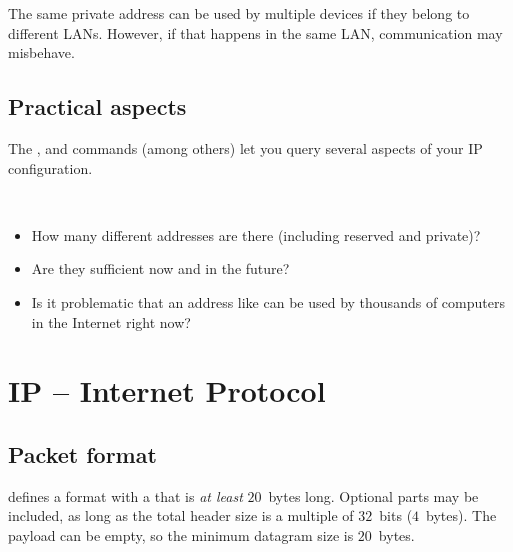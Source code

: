 \begin{remark}
The same private address can be used by multiple devices if they belong to different LANs.
However, if that happens in the same LAN, communication may misbehave.
\end{remark}

\subsection*{Practical aspects}

The ,  and  commands 
(among others) let you query several aspects of your IP configuration.

\begin{exercise}\ \\[-0.5cm]
\begin{itemize}
\item How many different  addresses are there (including reserved and private)? 
\item Are they sufficient now and in the future?
\item Is it problematic that an address like  can be used by thousands
  of computers in the Internet right now?
\end{itemize}
\end{exercise}


\section{IP -- Internet Protocol}

\subsection*{Packet format}

 defines a  format with a  
that is \textit{at least} $20$~bytes long. Optional parts may be included,
as long as the total header size is a multiple of $32$~bits ($4$~bytes).
The payload can be empty, so the minimum datagram size is $20$~bytes.\\

